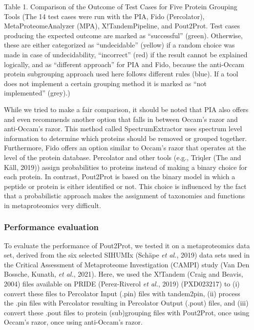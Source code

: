 Table 1. Comparison of the Outcome of Test Cases for Five Protein
Grouping Tools (The 14 test cases were run with the PIA, Fido
(Percolator), MetaProteomeAnalyzer (MPA), X!TandemPipeline, and
Pout2Prot. Test cases producing the expected outcome are marked as
``successful'' (green). Otherwise, these are either categorized as
``undecidable'' (yellow) if a random choice was made in case of
undecidability, ``incorrect'' (red) if the result cannot be explained
logically, and as ``different approach'' for PIA and Fido, because the
anti-Occam protein subgrouping approach used here follows different
rules (blue). If a tool does not implement a certain grouping method it
is marked as ``not implemented'' (grey).)

While we tried to make a fair comparison, it should be noted that PIA
also offers and even recommends another option that falls in between
Occam's razor and anti-Occam's razor. This method called
SpectrumExtractor uses spectrum level information to determine which
proteins should be removed or grouped together. Furthermore, Fido offers
an option similar to Occam's razor that operates at the level of the
protein database. Percolator and other tools (e.g., Triqler (The and
Käll, 2019)) assign probabilities to proteins instead of making a binary
choice for each protein. In contrast, Pout2Prot is based on the binary
model in which a peptide or protein is either identified or not. This
choice is influenced by the fact that a probabilistic approach makes the
assignment of taxonomies and functions in metaproteomics very difficult.

\hypertarget{performance-evaluation}{%
\subsubsection{Performance evaluation}\label{performance-evaluation}}

To evaluate the performance of Pout2Prot, we tested it on a
metaproteomics data set, derived from the six selected SIHUMIx (Schäpe
\emph{et al.}, 2019) data sets used in the Critical Assessment of
Metaproteome Investigation (CAMPI) study (Van Den Bossche, Kunath,
\emph{et al.}, 2021). Here, we used the X!Tandem (Craig and Beavis,
2004) files available on PRIDE (Perez-Riverol \emph{et al.}, 2019)
(PXD023217) to (i) convert these files to Percolator Input (.pin) files
with tandem2pin, (ii) process the .pin files with Percolator resulting
in Percolator Output (.pout) files, and (iii) convert these .pout files
to protein (sub)grouping files with Pout2Prot, once using Occam's razor,
once using anti-Occam's razor.

